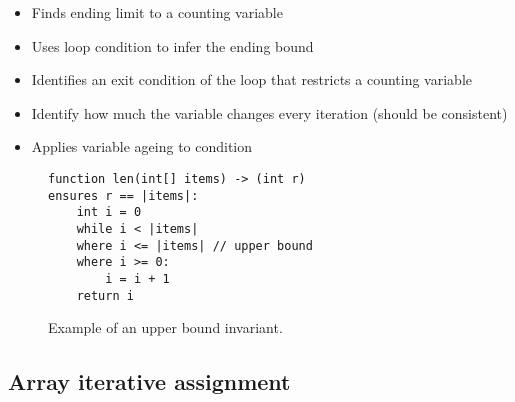 
\begin{itemize}
	\item Finds ending limit to a counting variable
	\item Uses loop condition to infer the ending bound
	\item Identifies an exit condition of the loop that restricts a counting variable
	\item Identify how much the variable changes every iteration (should be consistent)
	\item Applies variable ageing to condition
\end{itemize}

\begin{figure}[ht]
\begin{lstlisting}
function len(int[] items) -> (int r)
ensures r == |items|:
    int i = 0
    while i < |items|
    where i <= |items| // upper bound
    where i >= 0:
        i = i + 1
    return i
\end{lstlisting}
\caption{Example of an upper bound invariant.}
\label{lst:upper-bound}
\end{figure}

\subsection{Array iterative assignment}

